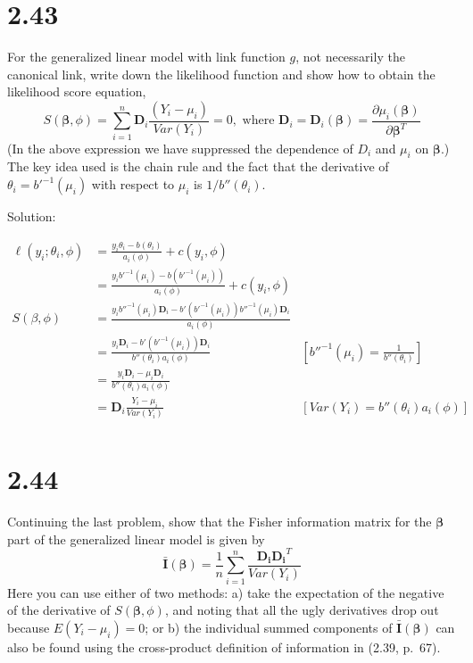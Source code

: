 \documentclass[
  letterpaper,
  DIV=11,
  numbers=noendperiod]{scrreprt}
\begin{document}
\newpage

\hypertarget{section-14}{%
\section{2.43}\label{section-14}}

For the generalized linear model with link function \(g\), not
necessarily the canonical link, write down the likelihood function and
show how to obtain the likelihood score equation,
\[S(\boldsymbol \beta, \phi) = \sum_{i=1}^n \mathbf D_i \frac{(Y_i-\mu_i)}{Var(Y_i)}=0, \text{ where } \mathbf D_i =\mathbf D_i(\boldsymbol \beta) = \frac{\partial \mu_i(\boldsymbol \beta)}{\partial \boldsymbol \beta^T}\]
(In the above expression we have suppressed the dependence of \(D_i\)
and \(\mu_i\) on \(\boldsymbol \beta\).) The key idea used is the chain
rule and the fact that the derivative of \(\theta_i= b'^{-1}(\mu_i)\)
with respect to \(\mu_i\) is \(1/b''(\theta_i)\).

Solution:

\[
\begin{aligned}
\ell (y_i;\theta_i,\phi) &= \frac{y_i\theta_i - b(\theta_i)}{a_i(\phi)} + c(y_i,\phi) \\
&= \frac{y_ib'^{-1}(\mu_i) - b(b'^{-1}(\mu_i))}{a_i(\phi)} + c(y_i,\phi) \\
S(\beta, \phi) &= \frac{y_ib''^{-1}(\mu_i)\mathbf D_i - b'(b'^{-1}(\mu_i))b''^{-1}(\mu_i) \mathbf D_i}{a_i(\phi)} \\
&= \frac{y_i\mathbf D_i - b'(b'^{-1}(\mu_i)) \mathbf D_i}{b''(\theta_i)a_i(\phi)} & \left[b''^{-1}(\mu_i) = \frac{1}{b''(\theta_i)}\right] \\
&= \frac{y_i\mathbf D_i - \mu_i \mathbf D_i}{b''(\theta_i)a_i(\phi)} \\
&= \mathbf D_i\frac{Y_i - \mu_i}{Var(Y_i)} & \left[Var(Y_i) = b''(\theta_i)a_i(\phi)\right]\\
\end{aligned}
\]

\newpage

\hypertarget{section-15}{%
\section{2.44}\label{section-15}}

Continuing the last problem, show that the Fisher information matrix for
the \(\boldsymbol \beta\) part of the generalized linear model is given
by
\[\bar{\mathbf I} ( \boldsymbol  \beta ) = \frac{1}{n} \sum_{i=1}^n \frac{\mathbf{D_i D_i}^T}{Var(Y_i)}\]
Here you can use either of two methods: a) take the expectation of the
negative of the derivative of \(S(\boldsymbol \beta, \phi)\), and noting
that all the ugly derivatives drop out because \(E(Y_i-\mu_i)=0\); or b)
the individual summed components of
\(\mathbf{\bar I}(\boldsymbol \beta)\) can also be found using the
cross-product definition of information in (2.39, p.~67).
\end{document}

